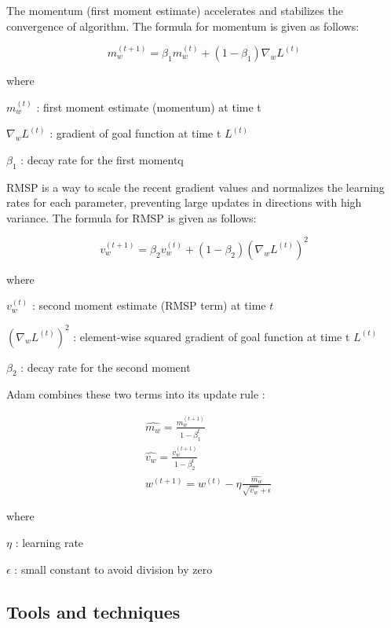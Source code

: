 The momentum (first moment estimate) accelerates and stabilizes the convergence of algorithm. The formula for momentum is given as follows:

\begin{equation}
	m_w^{(t+1)} = \beta_1 m_w^{(t)} + (1 - \beta_1) \nabla_w L^{(t)}
\end{equation}

\noindent where

\(m_w^{(t)}\) : first moment estimate (momentum) at time t

\(\nabla_w L^{(t)} \) : gradient of goal function at time t $L^{(t)}$

\(\beta_1 \) : decay rate for the first momentq

RMSP is a way to scale the recent gradient values and normalizes the learning rates for each parameter, preventing large updates in directions with high variance. The formula for RMSP is given as follows:

\begin{equation}
	v_w^{(t+1)} = \beta_2 v_w^{(t)} + (1 - \beta_2) (\nabla_w L^{(t)})^2
\end{equation}

\noindent where

\(v_w^{(t)}\) : second moment estimate (RMSP term) at time $t$

\( (\nabla_w L^{(t)})^2 \) : element-wise squared gradient of goal function at time t $L^{(t)}$

\(\beta_2 \) : decay rate for the second moment

\noindent Adam combines these two terms into its update rule \cite{kingma_adam:_2017}:

\begin{align*}
		&\hat{m_w} = \frac{m_w^{(t+1)}}{1-\beta_1^t} \\
		&\hat{v_w} = \frac{v_w^{(t+1)}}{1-\beta_2^t} \\
		&w^{(t+1)} = w^{(t)} - \eta \frac{\hat{m_w}}{\sqrt{\hat{v_w}} + \epsilon}
\end{align*}

\noindent where

\( \eta \) : learning rate

\( \epsilon \) : small constant to avoid division by zero

\newpage

\subsection{Tools and techniques}


